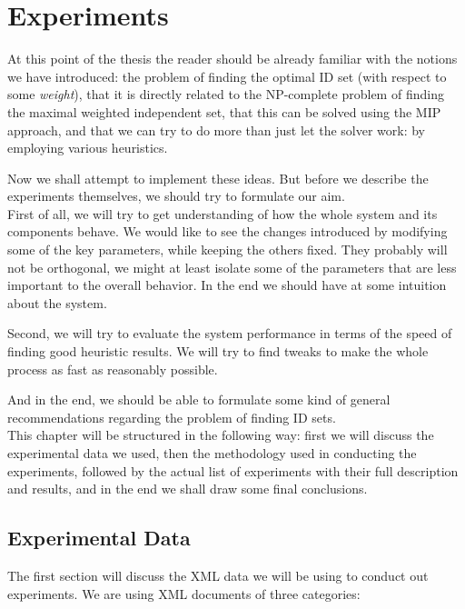 \chapter{Experiments}


At this point of the thesis the reader should be already familiar with the notions we have introduced: the problem of finding the optimal ID set (with respect to some \textit{weight}), that it is directly related to the NP-complete problem of finding the maximal weighted independent set, that this can be solved using the MIP approach, and that we can try to do more than just let the solver work: by employing various heuristics.

Now we shall attempt to implement these ideas. But before we describe the experiments themselves, we should try to formulate our aim.\\

First of all, we will try to get understanding of how the whole system and its components behave. We would like to see the changes introduced by modifying some of the key parameters, while keeping the others fixed. They probably will not be orthogonal, we might at least isolate some of the parameters that are less important to the overall behavior. In the end we should have at some intuition about the system.

Second, we will try to evaluate the system performance in terms of the speed of finding good heuristic results. We will try to find tweaks to make the whole process as fast as reasonably possible.

And in the end, we should be able to formulate some kind of general recommendations regarding the problem of finding ID sets.\\

This chapter will be structured in the following way: first we will discuss the experimental data we used, then the methodology used in conducting the experiments, followed by the actual list of experiments with their full description and results, and in the end we shall draw some final conclusions.

\section{Experimental Data}
\label{section-experiments-data}

The first section will discuss the XML data we will be using to conduct out experiments. We are using XML documents of three categories:

